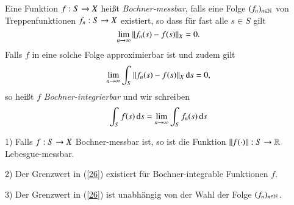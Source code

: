 \begin{defi}\label{4.22}
    Eine Funktion $f:S\rightarrow X$ heißt \textit{Bochner-messbar}, falls eine Folge $(f_n)_{n\in\mathbb{N}}$
    von Treppenfunktionen $f_n:S\rightarrow X$ existiert, so dass für fast alle $s\in S$ gilt
    \[
        \lim_{n\rightarrow \infty} \|f_n(s)-f(s)\| _X=0.
    \]
    Falls $f$ in eine solche Folge approximierbar ist und zudem gilt
    \[
        \lim_{n\rightarrow \infty} \int_S\|f_n(s)-f(s)\|_X \, \mathrm{d} s =0,
    \]
    so heißt $f$ \textit{Bochner-integrierbar} und wir schreiben
    \begin{align}\label{26}
        \int_S f(s)\, \mathrm{d} s=\lim_{n\rightarrow\infty} \int_S f_n(s)\, \mathrm{d} s
    \end{align}
\end{defi}

\begin{prop}\label{4.23}
    \begin{description}
    \item{1)}
    Falls $f:S\rightarrow X$ Bochner-messbar ist, so ist die Funktion $\|f(\cdot)\|:S\rightarrow \mathbb{R}$ Lebesgue-messbar.
    \item{2)}
    Der Grenzwert in (\ref{26}) existiert für Bochner-integrable Funktionen $f$.
    \item{3)}
    Der Grenzwert in (\ref{26}) ist unabhängig von der Wahl der Folge $(f_n)_{n\in\mathbb{N}}$. 
    \end{description}
\end{prop}

